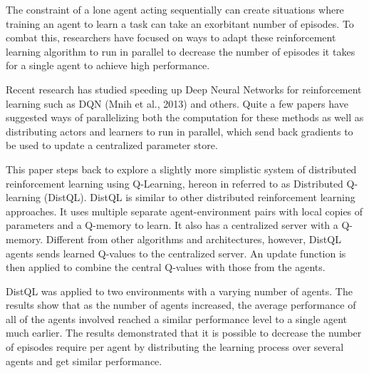 \documentclass[jair,twoside,11pt,theapa]{article}
\begin{document}
The constraint of a lone agent acting sequentially can create situations where training an agent to learn a task can take an exorbitant number of episodes. 
To combat this, researchers have focused on ways to adapt these reinforcement learning algorithm to run in parallel to decrease the number of episodes it takes for a single agent to achieve high performance.

Recent research has studied speeding up Deep Neural Networks for reinforcement learning such as DQN (Mnih et al., 2013)\nocite{Mnih2013} and others. Quite a few papers have suggested ways of parallelizing both the computation for these methods as well as distributing actors and learners to run in parallel, which send back gradients to be used to update a centralized parameter store. 

This paper steps back to explore a slightly more simplistic system of distributed reinforcement learning using Q-Learning, hereon in referred to as Distributed Q-learning (DistQL). DistQL is similar to other distributed reinforcement learning approaches. It uses multiple separate agent-environment pairs with local copies of parameters and a Q-memory to learn. It also has a centralized server with a Q-memory. Different from other algorithms and architectures, however, DistQL agents sends learned Q-values to the centralized server. An update function is then applied to combine the central Q-values with those from the agents. 

DistQL was applied to two environments with a varying number of agents. The results show that as the number of agents increased, the average performance of all of the agents involved reached a similar performance level to a single agent much earlier. The results demonstrated that it is possible to decrease the number of episodes require per agent by distributing the learning process over several agents and get similar performance.  

\end{document}
